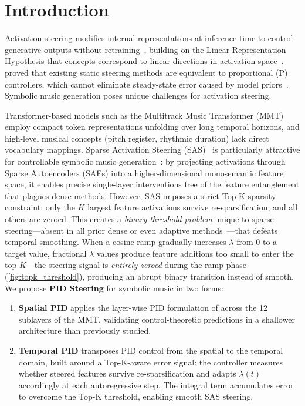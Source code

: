 \documentclass{article}
\theoremstyle{plain}
\begin{document}
\section{Introduction}
\label{sec:intro}

Activation steering modifies internal representations at inference time to control generative outputs without retraining~\cite{turner2024activation, li2023iti, rimsky2024steering}, building on the Linear Representation Hypothesis that concepts correspond to linear directions in activation space~\cite{park2024linear, elhage2022superposition}. \citet{nguyen2026pid} proved that existing static steering methods are equivalent to proportional (P) controllers, which cannot eliminate steady-state error caused by model priors~\cite{astrom1995pid}. Symbolic music generation poses unique challenges for activation steering.

Transformer-based models such as the Multitrack Music Transformer (MMT)~\cite{dong2023multitrack} employ compact token representations unfolding over long temporal horizons, and high-level musical concepts (pitch register, rhythmic duration) lack direct vocabulary mappings. Sparse Activation Steering (SAS)~\cite{bayat2025sas} is particularly attractive for controllable symbolic music generation~\cite{dong2023multitrack, facchiano2024musicgen, panda2024steering}: by projecting activations through Sparse Autoencoders (SAEs) into a higher-dimensional monosemantic feature space, it enables precise single-layer interventions free of the feature entanglement that plagues dense methods.
However, SAS imposes a strict Top-K sparsity constraint: only the $K$ largest feature activations survive re-sparsification, and all others are zeroed.
This creates a \emph{binary threshold problem} unique to sparse steering---absent in all prior dense or even adaptive methods~\cite{vogels2025ids, kang2026directer, li2026svf}---that defeats temporal smoothing.
When a cosine ramp gradually increases $\lambda$ from 0 to a target value, fractional $\lambda$ values produce feature additions too small to enter the top-$K$---the steering signal is \emph{entirely zeroed} during the ramp phase (\cref{fig:topk_threshold}), producing an abrupt binary transition instead of smooth. We propose \textbf{PID Steering} for symbolic music in two forms:
\begin{enumerate}
    \item \textbf{Spatial PID} applies the layer-wise PID formulation of \citet{nguyen2026pid} across the 12 sublayers of the MMT, validating control-theoretic predictions in a shallower architecture than previously studied.
    \item \textbf{Temporal PID} transposes PID control from the spatial to the temporal domain, built around a Top-K-aware error signal: the controller measures whether steered features survive re-sparsification and adapts $\lambda(t)$ accordingly at each autoregressive step. The integral term accumulates error to overcome the Top-K threshold, enabling smooth SAS steering.
\end{enumerate}
\end{document}
